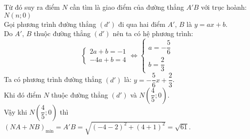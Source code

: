 \begin{ex}
{\begin{enumerate}[a)]
	 Từ đó suy ra điểm $N$ cần tìm là giao điểm của đường thẳng $A'B$ với trục hoành: $N(n;0)$\\
	 Gọi phương trình đường thẳng $(d')$ đi qua hai điểm $A'$, $B$ là $y=ax+b$.\\
	 Do $A'$, $B$ thuộc đường thẳng $(d')$ nên ta có hệ phương trình:
	 \[\begin{cases}
	 2a+b=-1\\
	 -4a+b=4
	 \end{cases}
	 \Leftrightarrow
	 \begin{cases}
	 a=-\dfrac{5}{6}\\
	 b=\dfrac{2}{3}
	 \end{cases}
	 \]
	 Ta có phương trình đường thẳng $(d')$ là: $y=-\dfrac{5}{6}x+\dfrac{2}{3}$.\\
	 Khi đó điểm $N$ thuộc đường thẳng $(d')$ và $N\left(\dfrac{4}{5};0\right)$.\\
	 Vậy khi $N\left(\dfrac{4}{5};0\right)$ thì $(NA+NB)_{\min}=A'B=\sqrt{(-4-2)^2+(4+1)^2}=\sqrt{61}$.
\end{enumerate}}
\end{ex}



